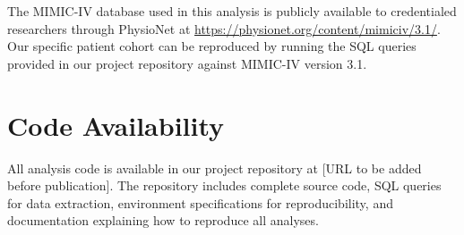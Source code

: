 \documentclass[11pt,a4paper]{article}
\begin{document}
The MIMIC-IV database used in this analysis is publicly available to credentialed researchers through PhysioNet at \url{https://physionet.org/content/mimiciv/3.1/}. Our specific patient cohort can be reproduced by running the SQL queries provided in our project repository against MIMIC-IV version 3.1.


\section*{Code Availability}

All analysis code is available in our project repository at [URL to be added before publication]. The repository includes complete source code, SQL queries for data extraction, environment specifications for reproducibility, and documentation explaining how to reproduce all analyses.


\printbibliography
\end{document}
